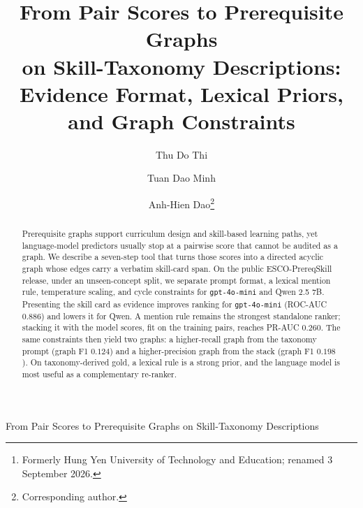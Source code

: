 \documentclass{ws-ijait}
\begin{document}
{From Pair Scores to Prerequisite Graphs on Skill-Taxonomy Descriptions}

\catchline{}{}{}{}{}

\title{From Pair Scores to Prerequisite Graphs\\
on Skill-Taxonomy Descriptions:\\
Evidence Format, Lexical Priors, and Graph Constraints}

\author{Thu Do Thi}

\address{Hung Yen University of Technology and Engineering\footnote{Formerly Hung Yen University of Technology and Education; renamed 3 September 2026.},
Hung Yen, Vietnam\\
thudt@utehy.edu.vn}

\author{Tuan Dao Minh}

\address{Hung Yen University of Technology and Engineering,
Hung Yen, Vietnam\\
tuanymc@utehy.edu.vn}

\author{Anh-Hien Dao\footnote{Corresponding author.}}

\address{Hung Yen University of Technology and Engineering,
Hung Yen, Vietnam\\
hienda@utehy.edu.vn}

\maketitle

\begin{history}
\end{history}

\begin{abstract}
Prerequisite graphs support curriculum design and skill-based
learning paths, yet language-model predictors usually stop at a
pairwise score that cannot be audited as a graph.
We describe a seven-step tool that turns those scores into a
directed acyclic graph whose edges carry a verbatim skill-card
span.
On the public {ESCO-PrereqSkill} release, under an unseen-concept
split, we separate prompt format, a lexical mention rule,
temperature scaling, and cycle constraints for
\texttt{gpt-4o-mini} and {Qwen} 2.5 7B.
Presenting the skill card as evidence improves ranking for
\texttt{gpt-4o-mini} ({ROC}-{AUC} $0.886$) and lowers it for
{Qwen}.
A mention rule remains the strongest standalone ranker; stacking
it with the model scores, fit on the training pairs, reaches
{PR}-{AUC} $0.260$.
The same constraints then yield two graphs: a higher-recall graph
from the taxonomy prompt (graph {F1} $0.124$) and a
higher-precision graph from the stack (graph {F1} $0.198$).
On taxonomy-derived gold, a lexical rule is a strong prior, and
the language model is most useful as a complementary re-ranker.
\end{abstract}
\end{document}
